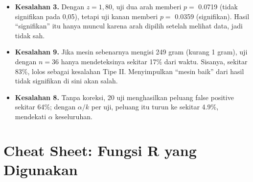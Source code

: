 \documentclass[
  indonesian,
  letterpaper,
]{book}
\providecommand{\tightlist}{%
  \setlength{\itemsep}{0pt}\setlength{\parskip}{0pt}}
\begin{document}
\begin{itemize}
\tightlist
\item
  \textbf{Kesalahan 3.} Dengan \(z = 1{,}80\), uji dua arah memberi
  \(p =\) 0.0719 (tidak signifikan pada 0,05), tetapi uji kanan memberi
  \(p =\) 0.0359 (signifikan). Hasil ``signifikan'' itu hanya muncul
  karena arah dipilih setelah melihat data, jadi tidak sah.
\item
  \textbf{Kesalahan 9.} Jika mesin sebenarnya mengisi 249 gram (kurang 1
  gram), uji dengan \(n = 36\) hanya mendeteksinya sekitar 17\% dari
  waktu. Sisanya, sekitar 83\%, lolos sebagai kesalahan Tipe II.
  Menyimpulkan ``mesin baik'' dari hasil tidak signifikan di sini akan
  salah.
\item
  \textbf{Kesalahan 8.} Tanpa koreksi, 20 uji menghasilkan peluang false
  positive sekitar 64\%; dengan \(\alpha/k\) per uji, peluang itu turun
  ke sekitar 4.9\%, mendekati \(\alpha\) keseluruhan.
\end{itemize}


\chapter{Cheat Sheet: Fungsi R yang
Digunakan}\label{cheat-sheet-fungsi-r-yang-digunakan-1}
\end{document}
